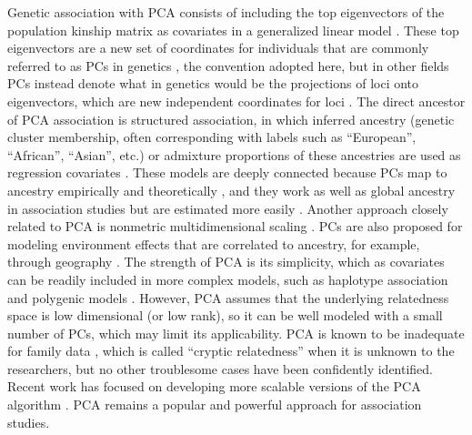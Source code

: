 \documentclass[9pt,lineno]{elife}
\begin{document}
Genetic association with PCA consists of including the top eigenvectors of the population kinship matrix as covariates in a generalized linear model \citep{zhang_semiparametric_2003, price_principal_2006, bouaziz_accounting_2011}.
These top eigenvectors are a new set of coordinates for individuals that are commonly referred to as PCs in genetics \citep{patterson_population_2006}, the convention adopted here, but in other fields PCs instead denote what in genetics would be the projections of loci onto eigenvectors, which are new independent coordinates for loci \citep{jolliffe_principal_2002}.
The direct ancestor of PCA association is structured association, in which inferred ancestry (genetic cluster membership, often corresponding with labels such as ``European'', ``African'', ``Asian'', etc.) or admixture proportions of these ancestries are used as regression covariates \citep{pritchard_association_2000}.
These models are deeply connected because PCs map to ancestry empirically \citep{alexander_fast_2009, zhou_strong_2016} and theoretically \citep{mcvean_genealogical_2009,zheng_eigenanalysis_2016,cabreros_likelihood-free_2019,chiu_inferring_2022}, and they work as well as global ancestry in association studies but are estimated more easily \citep{patterson_population_2006, zhao_arabidopsis_2007, alexander_fast_2009, bouaziz_accounting_2011}.
Another approach closely related to PCA is nonmetric multidimensional scaling \citep{zhu_nonmetric_2009}.
PCs are also proposed for modeling environment effects that are correlated to ancestry, for example, through geography \citep{novembre_genes_2008, zhang_principal_2015, lin_admixed_2021}.
The strength of PCA is its simplicity, which as covariates can be readily included in more complex models, such as haplotype association \citep{xu_detecting_2014} and polygenic models \citep{qian_fast_2020}.
However, PCA assumes that the underlying relatedness space is low dimensional (or low rank), so it can be well modeled with a small number of PCs, which may limit its applicability.
PCA is known to be inadequate for family data \citep{patterson_population_2006, zhu_nonmetric_2009, thornton_roadtrips:_2010, price_new_2010}, which is called ``cryptic relatedness'' when it is unknown to the researchers, but no other troublesome cases have been confidently identified.
Recent work has focused on developing more scalable versions of the PCA algorithm \citep{lee_sparse_2012, abraham_fast_2014, galinsky_fast_2016, abraham_flashpca2:_2017, agrawal_scalable_2020}.
PCA remains a popular and powerful approach for association studies.
\end{document}
